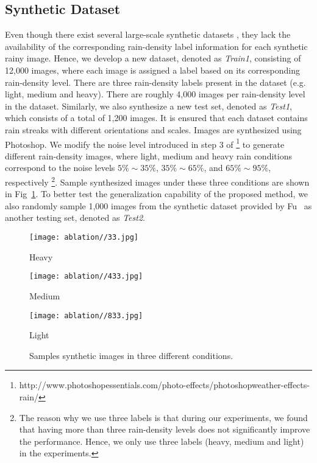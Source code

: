 \documentclass[10pt,twocolumn,letterpaper]{article}
\begin{document}
\subsection{Synthetic Dataset}
Even though there exist several large-scale synthetic datasets  \cite{derain_cvpr2017,derain_2017_zhang,derain_cvpr2017_multi}, they lack the availability of  the  corresponding rain-density label information for each synthetic rainy image.   Hence, we develop a new dataset, denoted as \emph{Train1}, consisting of 12,000 images, where each image is assigned a label  based on its corresponding rain-density level.  There are three rain-density labels present in the dataset (e.g. light, medium and heavy).  There are roughly 4,000 images per rain-density level in the dataset. Similarly, we also synthesize a new test set, denoted as \emph{Test1}, which consists of a total of 1,200 images.   It is ensured that each dataset contains rain streaks with different orientations  and scales.   Images are synthesized using Photoshop.   We modify the noise level introduced in step 3  of \footnote{http://www.photoshopessentials.com/photo-effects/photoshopweather-effects-rain/}
to generate different rain-density images, where light, medium and heavy rain conditions correspond to the noise levels $5\%\sim35\%$, $35\%\sim65\%$, and $65\%\sim95\%$, respectively \footnote{The reason why we use three labels is that during our experiments, we found that having more than three rain-density levels does not significantly improve the performance. Hence, we only use  three labels (heavy, medium and light) in the experiments.}.   Sample synthesized images under these three conditions are shown in Fig~\ref{fig:sample}.   To better test the  generalization capability of the proposed method, we  also randomly sample 1,000 images from the  synthetic dataset provided by Fu~\cite{derain_cvpr2017} as another testing set, denoted as \emph{Test2}. 

  \begin{figure}[htp!]
 	\centering
 	\begin{minipage}{.155\textwidth}
 		\centering
 		\texttt{[image: ablation//33.jpg]}
 		\captionsetup{labelformat=empty}
 		\captionsetup{justification=centering}
 		\vskip-10pt
 		\caption*{Heavy} 
 	\end{minipage}
 	\begin{minipage}{.155\textwidth}
 		\centering
 		\texttt{[image: ablation//433.jpg]}
 		\captionsetup{labelformat=empty}
 		\captionsetup{justification=centering}
 		\vskip-10pt
 		\caption*{Medium} 
 	\end{minipage}
 	\begin{minipage}{.155\textwidth}
 		\centering
 		\texttt{[image: ablation//833.jpg]}
 		\captionsetup{labelformat=empty}
 		\captionsetup{justification=centering}
 		\vskip-10pt
 		\caption*{Light} 
 	\end{minipage}
 	\vskip -10pt\caption{Samples synthetic images in three different conditions.} \label{fig:sample}
 \end{figure}
\end{document}
